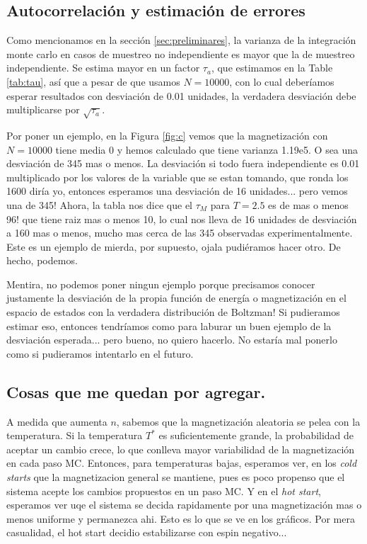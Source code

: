 \documentclass[a4paper,12pt]{article}
\begin{document}
\subsection{Autocorrelación y estimación de errores}

Como mencionamos en la sección \ref{sec:preliminares}, la varianza de la integración monte carlo en casos de muestreo no independiente es mayor que la de muestreo independiente. Se estima mayor en un factor $\tau_a$, que estimamos en la Table \ref{tab:tau}, así que a pesar de que usamos $N = 10000$, con lo cual deberíamos esperar resultados con desviación de 0.01 unidades, la verdadera desviación debe multiplicarse por $\sqrt{\tau_a}$.

Por poner un ejemplo, en la Figura \ref{fig:c} vemos que la magnetización con $N = 10000$ tiene media 0 y hemos calculado que tiene varianza 1.19e5. O sea una desviación de 345 mas o menos. La desviación si todo fuera independiente es 0.01 multiplicado por los valores de la variable que se estan tomando, que ronda los 1600 diría yo, entonces esperamos una desviación de 16 unidades... pero vemos una de 345! Ahora, la tabla nos dice que el $\tau_M$ para $T = 2.5$ es de mas o menos 96! que tiene raiz mas o menos 10, lo cual nos lleva de 16 unidades de desviación a 160 mas o menos, mucho mas cerca de las 345 observadas experimentalmente. Este es un ejemplo de mierda, por supuesto, ojala pudiéramos hacer otro. De hecho, podemos.

Mentira, no podemos poner ningun ejemplo porque precisamos conocer justamente la desviación de la propia función de energía o magnetización en el espacio de estados con la verdadera distribución de Boltzman! Si pudieramos estimar eso, entonces tendríamos como para laburar un buen ejemplo de la desviación esperada... pero bueno, no quiero hacerlo. No estaría mal ponerlo como si pudieramos intentarlo en el futuro.

\subsection{Cosas que me quedan por agregar.}

A medida que aumenta $n$, sabemos que la magnetización aleatoria se pelea con la temperatura. Si la temperatura $T^*$ es suficientemente grande, la probabilidad de aceptar un cambio crece, lo que conlleva mayor variabilidad de la magnetización en cada paso MC. Entonces, para temperaturas bajas, esperamos ver, en los {\it cold starts} que la magnetizacion general se mantiene, pues es poco propenso que el sistema acepte los cambios propuestos en un paso MC. Y en el {\it hot start}, esperamos ver uqe el sistema se decida rapidamente por una magnetización mas o menos uniforme y permanezca ahi. Esto es lo que se ve en los gráficos. Por mera casualidad, el hot start decidio estabilizarse con espin negativo...
\end{document}
